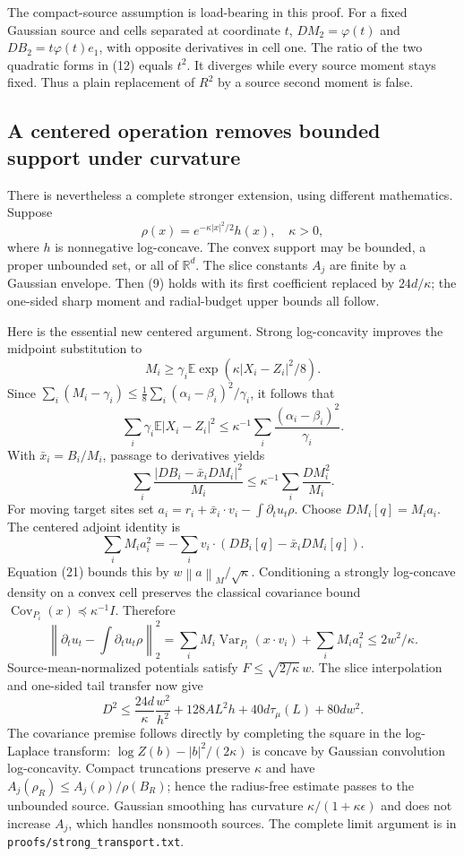 \documentclass[11pt]{article}
\newcommand{\norm}[1]{\left\lVert#1\right\rVert}
\begin{document}
The compact-source assumption is load-bearing in this proof. For a fixed Gaussian source and cells separated at coordinate $t$, $DM_2=\varphi(t)$ and $DB_2=t\varphi(t)e_1$, with opposite derivatives in cell one. The ratio of the two quadratic forms in (12) equals $t^2$. It diverges while every source moment stays fixed. Thus a plain replacement of $R^2$ by a source second moment is false.

\subsection{A centered operation removes bounded support under curvature}

There is nevertheless a complete stronger extension, using different mathematics. Suppose
\[
\rho(x)=e^{-\kappa|x|^2/2}h(x),\quad \kappa>0,
\]
where $h$ is nonnegative log-concave. The convex support may be bounded, a proper unbounded set, or all of $\mathbb R^d$. The slice constants $A_j$ are finite by a Gaussian envelope. Then (9) holds with its first coefficient replaced by $24d/\kappa$; the one-sided sharp moment and radial-budget upper bounds all follow.

Here is the essential new centered argument. Strong log-concavity improves the midpoint substitution to
\[
M_i\ge\gamma_i\mathbb E\exp(\kappa|X_i-Z_i|^2/8).
\]
Since $\sum_i(M_i-\gamma_i)\le\tfrac18\sum_i(\alpha_i-\beta_i)^2/\gamma_i$, it follows that
\[
\sum_i\gamma_i\mathbb E|X_i-Z_i|^2
\le\kappa^{-1}\sum_i\frac{(\alpha_i-\beta_i)^2}{\gamma_i}.
\]
With $\bar x_i=B_i/M_i$, passage to derivatives yields
\[
\sum_i\frac{|DB_i-\bar x_iDM_i|^2}{M_i}
\le\kappa^{-1}\sum_i\frac{DM_i^2}{M_i}.\tag{21}
\]
For moving target sites set $a_i=r_i+\bar x_i\cdot v_i-\int\partial_tu_t\rho$. Choose $DM_i[q]=M_i a_i$. The centered adjoint identity is
\[
\sum_i M_i a_i^2=-\sum_i v_i\cdot(DB_i[q]-\bar x_iDM_i[q]).
\]
Equation (21) bounds this by $w\norm a_M/\sqrt\kappa$. Conditioning a strongly log-concave density on a convex cell preserves the classical covariance bound $\operatorname{Cov}_{P_i}(x)\preceq\kappa^{-1}I$. Therefore
\[
\norm{\partial_tu_t-\int\partial_tu_t\rho}_2^2
=\sum_iM_i\operatorname{Var}_{P_i}(x\cdot v_i)+\sum_iM_i a_i^2
\le2w^2/\kappa.
\]
Source-mean-normalized potentials satisfy $F\le\sqrt{2/\kappa}\,w$. The slice interpolation and one-sided tail transfer now give
\[
D^2\le\frac{24d}{\kappa}\frac{w^2}{h^2}+128AL^2h+40d\tau_\mu(L)+80dw^2.\tag{22}
\]
The covariance premise follows directly by completing the square in the log-Laplace transform: $\log Z(b)-|b|^2/(2\kappa)$ is concave by Gaussian convolution log-concavity. Compact truncations preserve $\kappa$ and have $A_j(\rho_R)\le A_j(\rho)/\rho(B_R)$; hence the radius-free estimate passes to the unbounded source. Gaussian smoothing has curvature $\kappa/(1+\kappa\epsilon)$ and does not increase $A_j$, which handles nonsmooth sources. The complete limit argument is in \texttt{proofs/strong\_transport.txt}.
\end{document}
